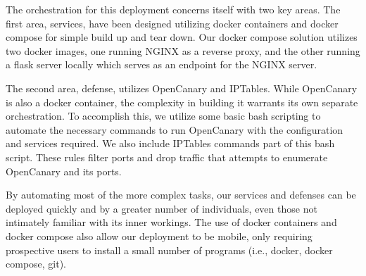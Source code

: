 The orchestration for this deployment concerns itself with two key areas. The first area, services, 
have been designed utilizing docker containers and docker compose for simple build up and tear down. 
Our docker compose solution utilizes two docker images, one running NGINX as a reverse proxy, 
and the other running a flask server locally which serves as an endpoint for the NGINX server. 

The second area, defense, utilizes OpenCanary and IPTables. While OpenCanary is also a docker container, the 
complexity in building it warrants its own separate orchestration. To accomplish this, we utilize 
some basic bash scripting to automate the necessary commands to run OpenCanary with the configuration and 
services required. We also include IPTables commands part of this bash script. These rules filter ports and 
drop traffic that attempts to enumerate OpenCanary and its ports. 

By automating most of the more complex tasks, our services and defenses can be deployed quickly 
and by a greater number of individuals, even those not intimately familiar with its inner workings. 
The use of docker containers and docker compose also allow our deployment to be mobile, only requiring 
prospective users to install a small number of programs (i.e., docker, docker compose, git). 
